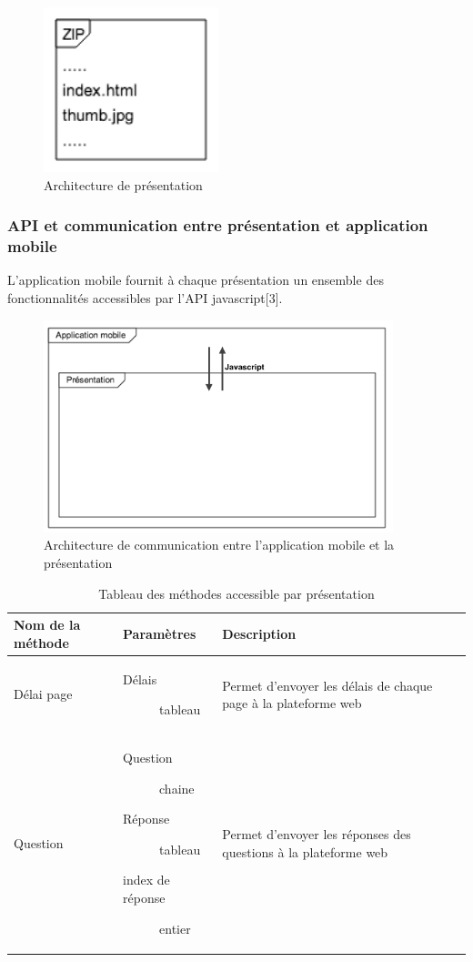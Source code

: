 \documentclass[12pt, ChapStyle1, oneside]{./Styles/Dea_Gsm}
\begin{document}
\begin{figure}[H]
    \centering
    \includegraphics[width=2.0in]{zippresentation}
    \caption{Architecture de présentation}
    \label{diagdeploit}
\end{figure}

\subsubsection{API et communication entre présentation et application mobile}
L'application mobile fournit à chaque présentation un ensemble des fonctionnalités accessibles par l'API javascript[3].
\begin{figure}[H]
    \centering
    \includegraphics[width=4.0in]{apipresentation}
    \caption{Architecture de communication entre l'application mobile et la présentation}
    \label{diagdeploit}
\end{figure}


\begin{table}[H]
\centering
\begin{tabular}{ | p{3cm} | p{5cm} | p{5cm} | }
 \hline
 Nom de la méthode & Paramètres & Description \\
 \hline
 Délai page  & 
  \begin{description}
 \item[Délais] tableau
 \end{description}
 & Permet d'envoyer les délais de chaque page à la plateforme web\\
  \hline
 Question  & 
 \begin{description}
 \item[Question] chaine
 \item[Réponse] tableau
 \item[index de réponse] entier
 \end{description}
 & Permet d'envoyer les réponses des questions à la plateforme web\\
\hline
\end{tabular}
\caption{Tableau des méthodes accessible par présentation}
\label{table:1}
\end{table}
\end{document}
